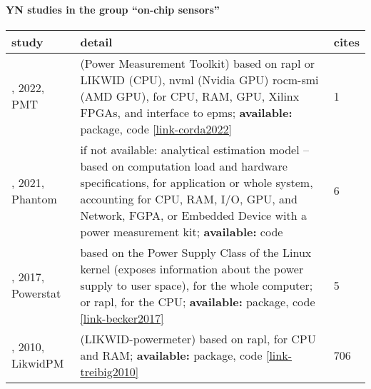 \paragraph{YN studies in the group ``on-chip sensors''} 
 \label{tab:YN-on-chip-sensors} 
\begin{longtable}{|>{\raggedright\arraybackslash}p{2.75cm}|p{11.75cm}|p{0.7cm}|}
\toprule
\bfseries study & \bfseries detail & \bfseries cites \\
\midrule 
\endhead
\cite{corda2022}, 2022, PMT &  (Power Measurement Toolkit) based on \acrshort{rapl} or LIKWID (CPU), \acrshort{nvml} (Nvidia GPU) rocm-smi (AMD GPU), for CPU, RAM, GPU, Xilinx FPGAs, and interface to \acrshort{epm}s; \textbf{available:} package, code \href{https://git.astron.nl/RD/pmt}{\ref*{link-corda2022}} & 1 \\
\cite{montanana-aliaga2021}, 2021, Phantom & if not available: analytical estimation model -- based on computation load and hardware specifications, for application or whole system, accounting for CPU, RAM, I/O, GPU, and Network, FGPA, or Embedded Device with a power measurement kit; \textbf{available:} code & 6 \\
\cite{becker2017}, 2017, Powerstat & based on the Power Supply Class of the Linux kernel (exposes information about the power supply to user space), for the whole computer; or \acrshort{rapl}, for the CPU; \textbf{available:} package, code \href{https://github.com/ColinIanKing/powerstat}{\ref*{link-becker2017}} & 5 \\
\cite{treibig2010}, 2010, LikwidPM &  (LIKWID-powermeter) based on \acrshort{rapl}, for CPU and RAM; \textbf{available:} package, code \href{https://github.com/RRZE-HPC/likwid}{\ref*{link-treibig2010}} & 706 \\
\bottomrule
\end{longtable}
